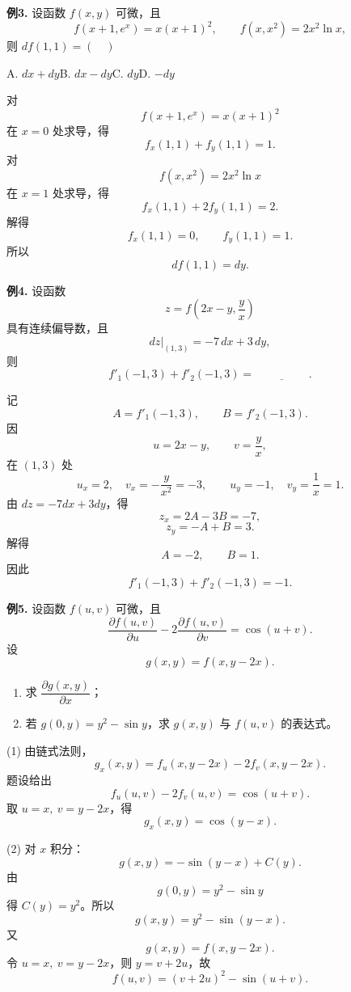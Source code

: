 \begin{problemblock}
\textbf{例3.} 设函数 \(f(x,y)\) 可微，且
\[
f(x+1,e^x)=x(x+1)^2,\qquad
f(x,x^2)=2x^2\ln x,
\]
则 \(df(1,1)=(\quad)\)

A. \(dx+dy\)\qquad B. \(dx-dy\)\qquad C. \(dy\)\qquad D. \(-dy\)
\end{problemblock}
\begin{solutionblock}
对
\[
f(x+1,e^x)=x(x+1)^2
\]
在 \(x=0\) 处求导，得
\[
f_x(1,1)+f_y(1,1)=1.
\]
对
\[
f(x,x^2)=2x^2\ln x
\]
在 \(x=1\) 处求导，得
\[
f_x(1,1)+2f_y(1,1)=2.
\]
解得
\[
f_x(1,1)=0,\qquad f_y(1,1)=1.
\]
所以
\[
df(1,1)=dy.
\]
\end{solutionblock}

\begin{problemblock}
\textbf{例4.} 设函数
\[
z=f\left(2x-y,\frac yx\right)
\]
具有连续偏导数，且
\[
dz\big|_{(1,3)}=-7\,dx+3\,dy,
\]
则
\[
f'_1(-1,3)+f'_2(-1,3)=\underline{\hspace{2cm}}.
\]
\end{problemblock}
\begin{solutionblock}
记
\[
A=f'_1(-1,3),\qquad B=f'_2(-1,3).
\]
因
\[
u=2x-y,\qquad v=\frac yx,
\]
在 \((1,3)\) 处
\[
u_x=2,\quad v_x=-\frac y{x^2}=-3,\qquad
u_y=-1,\quad v_y=\frac1x=1.
\]
由 \(dz=-7dx+3dy\)，得
\[
z_x=2A-3B=-7,
\]
\[
z_y=-A+B=3.
\]
解得
\[
A=-2,\qquad B=1.
\]
因此
\[
f'_1(-1,3)+f'_2(-1,3)=-1.
\]
\end{solutionblock}

\begin{problemblock}
\textbf{例5.} 设函数 \(f(u,v)\) 可微，且
\[
\frac{\partial f(u,v)}{\partial u}-2\frac{\partial f(u,v)}{\partial v}
=\cos(u+v).
\]
设
\[
g(x,y)=f(x,y-2x).
\]
\begin{enumerate}[label=(\arabic*), leftmargin=2.2em]
\item 求 \(\dfrac{\partial g(x,y)}{\partial x}\)；
\item 若 \(g(0,y)=y^2-\sin y\)，求 \(g(x,y)\) 与 \(f(u,v)\) 的表达式。
\end{enumerate}
\end{problemblock}
\begin{solutionblock}
(1) 由链式法则，
\[
g_x(x,y)=f_u(x,y-2x)-2f_v(x,y-2x).
\]
题设给出
\[
f_u(u,v)-2f_v(u,v)=\cos(u+v).
\]
取 \(u=x,\ v=y-2x\)，得
\[
g_x(x,y)=\cos(y-x).
\]

(2) 对 \(x\) 积分：
\[
g(x,y)=-\sin(y-x)+C(y).
\]
由
\[
g(0,y)=y^2-\sin y
\]
得 \(C(y)=y^2\)。所以
\[
g(x,y)=y^2-\sin(y-x).
\]
又
\[
g(x,y)=f(x,y-2x).
\]
令 \(u=x,\ v=y-2x\)，则 \(y=v+2u\)，故
\[
f(u,v)=(v+2u)^2-\sin(u+v).
\]
\end{solutionblock}

